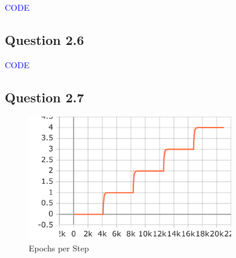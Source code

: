 \documentclass{article}
\begin{document}
\textcolor{blue}{CODE}

\subsection*{Question 2.6}

\textcolor{blue}{CODE}

\subsection*{Question 2.7}

\begin{figure}[H]
    \centering
    \includegraphics[width=0.8\textwidth]{images/epoch.pdf}
    \caption{Epochs per Step}
    \label{fig:loss_epochs}
\end{figure}

\end{document}
